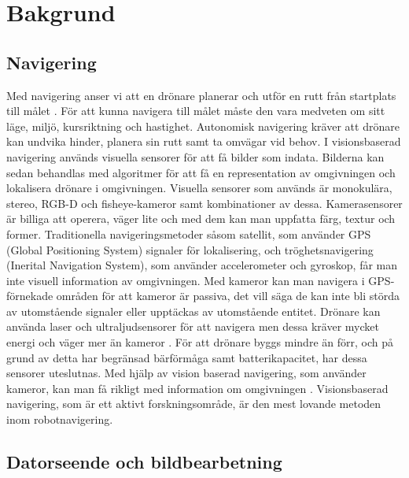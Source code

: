 \chapter{Bakgrund}

\section{Navigering}

Med navigering anser vi att en drönare planerar och utför en rutt från startplats till målet \citep{geospatial}. För att kunna navigera till målet måste den vara medveten om sitt läge, miljö, kursriktning och hastighet. Autonomisk navigering kräver att drönare kan undvika hinder, planera sin rutt samt ta omvägar vid behov. I visionsbaserad navigering används visuella sensorer för att få bilder som indata. Bilderna kan sedan behandlas med algoritmer för att få en representation av omgivningen och lokalisera drönare i omgivningen. Visuella sensorer som används är monokulära, stereo, RGB-D och fisheye-kameror samt kombinationer av dessa. Kamerasensorer är billiga att operera, väger lite och med dem kan man uppfatta färg, textur och former. Traditionella navigeringsmetoder såsom satellit, som använder GPS (Global Positioning System) signaler för lokalisering, och tröghetsnavigering (Inerital Navigation System), som använder accelerometer och gyroskop, får man inte visuell information av omgivningen. Med kameror kan man navigera i GPS-förnekade områden för att kameror är passiva, det vill säga de kan inte bli störda av utomstående signaler eller upptäckas av utomstående entitet. Drönare kan använda laser och ultraljudsensorer för att navigera men dessa kräver mycket energi och väger mer än kameror \citep{6385934}. För att drönare byggs mindre än förr, och på grund av detta har begränsad bärförmåga samt batterikapacitet, har dessa sensorer uteslutnas. Med hjälp av vision baserad navigering, som använder kameror, kan man få rikligt med information om omgivningen \citep{geospatial}. Visionsbaserad navigering, som är ett aktivt forskningsområde, är den mest lovande metoden inom robotnavigering.

\section{Datorseende och bildbearbetning}

